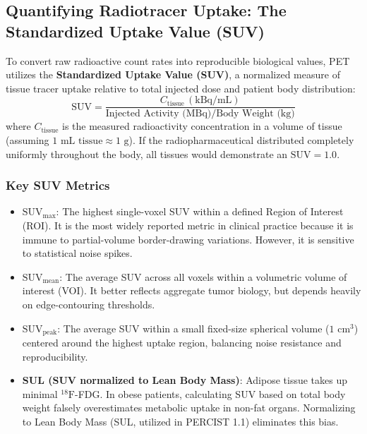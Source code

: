 \documentclass[11pt,a4paper]{article}
\begin{document}
\subsection{Quantifying Radiotracer Uptake: The Standardized Uptake Value (SUV)}
To convert raw radioactive count rates into reproducible biological values, PET utilizes the \textbf{Standardized Uptake Value (SUV)}, a normalized measure of tissue tracer uptake relative to total injected dose and patient body distribution:
\begin{equation}
    \text{SUV} = \frac{C_{\text{tissue}} \, (\text{kBq/mL})}{\text{Injected Activity (MBq)} / \text{Body Weight (kg)}}
\end{equation}
where $C_{\text{tissue}}$ is the measured radioactivity concentration in a volume of tissue (assuming $1\text{ mL tissue} \approx 1\text{ g}$). If the radiopharmaceutical distributed completely uniformly throughout the body, all tissues would demonstrate an $\text{SUV} = 1.0$.

\subsubsection{Key SUV Metrics}
\begin{itemize}[leftmargin=*]
    \item \textbf{$\text{SUV}_{\max}$}: The highest single-voxel SUV within a defined Region of Interest (ROI). It is the most widely reported metric in clinical practice because it is immune to partial-volume border-drawing variations. However, it is sensitive to statistical noise spikes.
    \item \textbf{$\text{SUV}_{\text{mean}}$}: The average SUV across all voxels within a volumetric volume of interest (VOI). It better reflects aggregate tumor biology, but depends heavily on edge-contouring thresholds.
    \item \textbf{$\text{SUV}_{\text{peak}}$}: The average SUV within a small fixed-size spherical volume ($1\text{ cm}^3$) centered around the highest uptake region, balancing noise resistance and reproducibility.
    \item \textbf{SUL (SUV normalized to Lean Body Mass)}: Adipose tissue takes up minimal $^{18}\text{F}$-FDG. In obese patients, calculating SUV based on total body weight falsely overestimates metabolic uptake in non-fat organs. Normalizing to Lean Body Mass (SUL, utilized in PERCIST 1.1) eliminates this bias.
\end{itemize}
\end{document}
